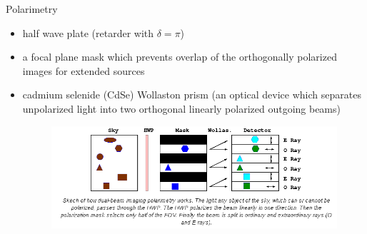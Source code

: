 \documentclass{beamer}
\begin{document}
\begin{frame}{Polarimetry}

\begin{itemize}
\item half wave plate (retarder with $\delta = \pi$)
\item  a focal plane mask which prevents overlap of the orthogonally polarized images for extended sources
\item cadmium selenide (CdSe) Wollaston prism (an optical device which separates  unpolarized light into two orthogonal 
linearly polarized outgoing beams)
\begin{figure}[H]
 \centering
 \includegraphics[scale=0.4]{img1.png}
\end{figure}
\end{itemize}

\end{frame}
\end{document}
